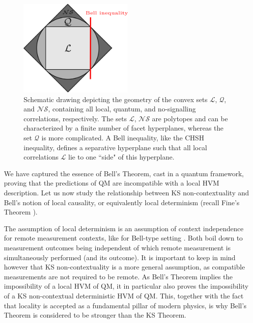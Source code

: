 \begin{figure}
    \centering
    \includegraphics[width=0.5\textwidth]{images/correlations.png}
    \caption{Schematic drawing depicting the geometry of the convex sets $\mathcal{L}$, $\mathcal{Q}$, and $\mathcal{NS}$, containing all local, quantum, and no-signalling correlations, respectively. The sets $\mathcal{L}$, $\mathcal{NS}$ are polytopes and can be characterized by a finite number of facet hyperplanes, whereas the set $\mathcal{Q}$ is more complicated. A Bell inequality, like the CHSH inequality, defines a separative hyperplane such that all local correlations $\mathcal{L}$ lie to one ``side" of this hyperplane.}
    \label{fig:correlations}
\end{figure}

We have captured the essence of Bell's Theorem, cast in a quantum framework, proving that the predictions of QM are incompatible with a local HVM description. Let us now study the relationship between KS non-contextuality and Bell's notion of local causality, or equivalently local determinism (recall Fine's Theorem \cite{Fine1982}). 

The assumption of local determinism is an assumption of context independence for remote measurement contexts, like for Bell-type setting \cite{Spekkens2012}. Both boil down to measurement outcomes being independent of which remote measurement is simultaneously performed (and its outcome). It is important to keep in mind however that KS non-contextuality is a more general assumption, as compatible measurements are not required to be remote.
As Bell's Theorem implies the impossibility of a local HVM of QM, it in particular also proves the impossibility of a KS non-contextual deterministic HVM of QM. This, together with the fact that locality is accepted as a fundamental pillar of modern physics, is why Bell's Theorem is considered to be stronger than the KS Theorem. 

